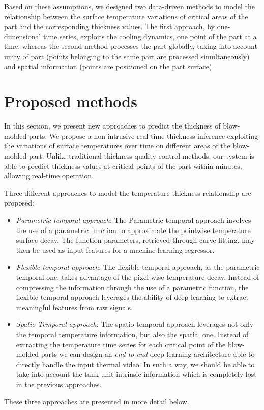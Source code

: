 Based on these assumptions, we designed two data-driven methods to model the relationship between the surface temperature variations of critical areas of the part and the corresponding thickness values. The first approach, by one-dimensional time series, exploits the cooling dynamics, one point of the part at a time, whereas the second method processes the part globally, taking into account unity of part (points belonging to the same part are processed simultaneously) and spatial information (points are positioned on the part surface).

\section{Proposed methods}

In this section, we present new approaches to predict the thickness of blow-molded parts. We propose a non-intrusive real-time thickness inference exploiting the variations of surface temperatures over time on different areas of the blow-molded part. 
Unlike traditional thickness quality control methods, our system is able to predict thickness values at critical points of the part within minutes, allowing real-time operation.

Three different approaches to model the temperature-thickness relationship are proposed:
%
\begin{itemize}
    \item \textit{Parametric temporal approach}: The Parametric temporal approach involves the use of a parametric function to approximate the pointwise temperature surface decay. The function parameters, retrieved through curve fitting, may then be used as input features for a machine learning regressor.
    \item \textit{Flexible temporal approach}: The flexible temporal approach, as the parametric temporal one, takes advantage of the pixel-wise temperature decay. Instead of compressing the information through the use of a parametric function, the flexible temporal approach leverages the ability of deep learning to extract meaningful features from raw signals.
    \item \textit{Spatio-Temporal approach}: The spatio-temporal approach leverages not only the temporal temperature information, but also the spatial one. Instead of extracting the temperature time series for each critical point of the blow-molded parts we can design an \textit{end-to-end} deep learning architecture able to directly handle the input thermal video. 
    In such a way, we should be able to take into account the tank unit intrinsic information which is completely lost in the previous approaches.
\end{itemize}
%
These three approaches are presented in more detail below.

